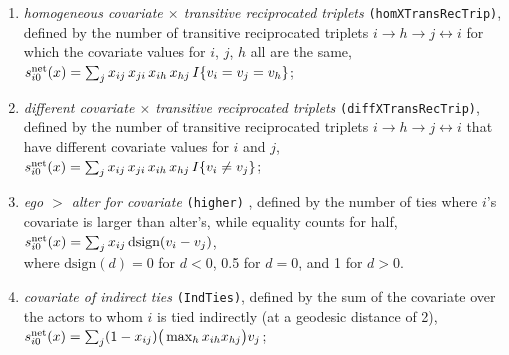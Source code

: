 \documentclass[a4paper,fleqn,11pt]{article}
\newcommand{\+}{\, + \,}
\newcommand{\vit}{\theenumi}
\begin{document}
\begin{enumerate}
 \item {\em homogeneous covariate $\times$ transitive reciprocated triplets}
 \texttt{(homXTransRecTrip)}, defined by the number of transitive
 reciprocated triplets
 $i \rightarrow h \rightarrow j \leftrightarrow i$
 for which the covariate values for $i$, $j$, $h$ all are the same,\\
 $s^{\rm net}_{i\vit}(x) =
 \sum_j x_{ij}\, x_{ji}\, x_{ih} \, x_{hj} \, I\{v_i = v_j = v_h\}$;

 \item {\em different covariate $\times$ transitive reciprocated triplets}
 \texttt{(diffXTransRecTrip)}, defined by the number of transitive
 reciprocated triplets
 $i \rightarrow h \rightarrow j \leftrightarrow i$
 that have different covariate values for $i$ and $j$,\\
 $s^{\rm net}_{i\vit}(x) =
 \sum_j x_{ij}\, x_{ji}\, x_{ih} \, x_{hj} \, I\{v_i \neq v_j\}$;

 \item {\em ego $>$ alter for covariate} \texttt{(higher)} ,
 defined by the number of ties where $i$'s covariate
 is larger than alter's, while equality counts for half,\\
 $s^{\rm net}_{i\vit}(x) =  \sum_j x_{ij}\, \text{dsign}(v_i - v_j) $,\\
 where $\text{dsign}(d) = 0$ for $d < 0$, 0.5 for $d = 0$,
 and 1 for $d > 0$.

 \item {\em covariate of indirect ties}
 \texttt{(IndTies)}, %
 defined by
 the sum of the covariate over the actors
 to whom $i$ is tied indirectly (at a geodesic distance of 2),\\
 $s^{\rm net}_{i\vit}(x) = \sum_j (1 -x_{ij})
                      \big( \max_h x_{ih}x_{hj} \big) v_j $;


\end{enumerate}
\end{document}
